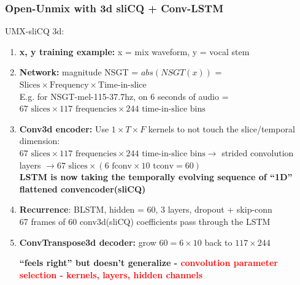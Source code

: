 \documentclass[usenames,dvipsnames]{beamer}
\begin{document}
\begin{frame}
	\frametitle{Open-Unmix with 3d sliCQ + Conv-LSTM}
	UMX-sliCQ 3d:
	\begin{enumerate}
		\item
			\textbf{x, y training example:} x = mix waveform, y = vocal stem
		\item
			\textbf{Network:} magnitude NSGT = $abs(NSGT(x))$ = $\text{Slices} \times \text{Frequency} \times \text{Time-in-slice}$\\E.g. for NSGT-mel-115-37.7hz, on 6 seconds of audio = $67 \text{ slices} \times 117 \text{ frequencies} \times 244 \text{ time-in-slice bins} $
		\item
			\textbf{Conv3d encoder:} Use $1 \times T \times F$ kernels to not touch the slice/temporal dimension:\\
			$67 \text{ slices} \times 117 \text{ frequencies} \times 244 \text{ time-in-slice bins} \rightarrow$ strided convolution layers $\rightarrow 67 \text{ slices} \times (6 \text { fconv} \times 10 \text { tconv} = 60)$\\
			\textbf{LSTM is now taking the temporally evolving sequence of ``1D'' flattened convencoder(sliCQ)}
		\item
			\textbf{Recurrence}: BLSTM, hidden = 60, 3 layers, dropout + skip-conn\\
			67 frames of 60 conv3d(sliCQ) coefficients pass through the LSTM
		\item
			\textbf{ConvTranspose3d decoder:} grow $60 = 6 \times 10$ back to $117 \times 244$

			\textbf{``feels right'' but doesn't generalize - \textcolor{red}{convolution parameter selection - kernels, layers, hidden channels}}
	\end{enumerate}
\end{frame}
\end{document}

